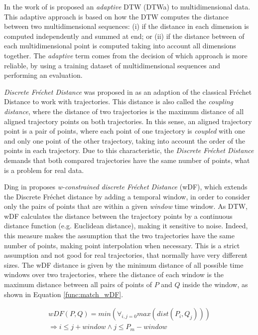 In the work of \cite{Shokoohi-Yekta2017} is proposed an \emph{adaptive} DTW (DTWa) to multidimensional data. This adaptive approach is based on how the DTW computes the distance between two multidimensional sequences: (i) if the distance in each dimension is computed independently and summed at end; or (ii) if the distance between of each multidimensional point is computed taking into account all dimensions together. The \emph{adaptive} term comes from the decision of which approach is more reliable, by using a training dataset of multidimensional sequences and performing an evaluation.

\emph{Discrete Fr{\'e}chet Distance} was proposed in \cite{eiter1994computing} as an adaption of the classical Fr{\'e}chet Distance \cite{Frechet1906} to work with trajectories. This distance is also called the \emph{coupling} \emph{distance}, where the distance of two trajectories is the maximum distance of all aligned trajectory points on both trajectories. In this sense, an aligned trajectory point is a pair of points, where each point of one trajectory is \emph{coupled} with one and only one point of the other trajectory, taking into account the order of the points in each trajectory. Due to this characteristic, the \emph{Discrete Fr{\'e}chet Distance} demands that both compared trajectories have the same number of points, what is a problem for real data.

Ding in \cite{Ding:2008:ESJ:1440463.1440989} proposes \emph{w-constrained discrete Fr{\'e}chet Distance} (wDF), which extends the Discrete Fr{\'e}chet distance \cite{eiter1994computing} by adding a temporal window, in order to consider only the pairs of points that are within a given \emph{window} time window. As DTW, wDF calculates the distance between the trajectory points by a continuous distance function (e.g. Euclidean distance), making it sensitive to noise. Indeed, this measure makes the assumption that the two trajectories have the same number of points, making point interpolation when necessary. This is a strict assumption and not good for real trajectories, that normally have very different sizes. The wDF distance is given by the minimum distance of all possible time windows over two trajectories, where the distance of each window is the maximum distance between all pairs of points of $P$ and $Q$ inside the window, as shown in Equation \ref{func:match_wDF}.

\begin{equation}
\begin{split}
\label{func:match_wDF}
  wDF(P, Q) = min(\forall_{i,j=0}max(dist(P_i, Q_j))) \\
  \Rightarrow i \leq j + window \land j \leq P_{m} - window
\end{split}
\end{equation}

